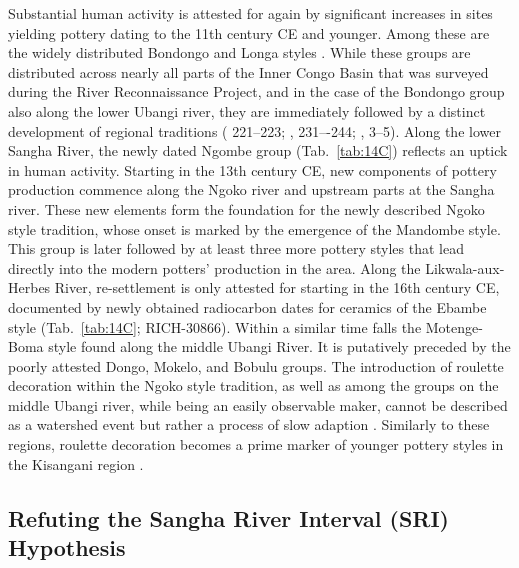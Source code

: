\documentclass[smallextended,natbib]{svjour3}       %
\begin{document}
Substantial human activity is attested for again by significant increases in sites yielding pottery dating to the 11th century CE and younger. Among these are the widely distributed Bondongo and Longa styles \citep[Fig.~\ref{fig:bayes}; \ref{fig:chrono}; Tab.~\ref{tab:bayes};][121--139]{Wotzka.1995}. While these groups are distributed across nearly all parts of the Inner Congo Basin that was surveyed during the River Reconnaissance Project, and in the case of the Bondongo group also along the lower Ubangi river, they are immediately followed by a distinct development of regional traditions (\citeauthor{Wotzka.1995} \citeyear{Wotzka.1995} 221--223; \citeauthor{Seidensticker.2021e} \citeyear{Seidensticker.2021e}, 231–-244; \citeauthor{Seidensticker.2021} \citeyear{Seidensticker.2021}, 3--5). Along the lower Sangha River, the newly dated Ngombe group (Tab.~\ref{tab:14C}) reflects an uptick in human activity. Starting in the 13th century CE, new components of pottery production commence along the Ngoko river and upstream parts at the Sangha river. These new elements form the foundation for the newly described Ngoko style tradition, whose onset is marked by the emergence of the Mandombe style. This group is later followed by at least three more pottery styles that lead directly into the modern potters’ production in the area. Along the Likwala-aux-Herbes River, re-settlement is only attested for starting in the 16th century CE, documented by newly obtained radiocarbon dates for ceramics of the Ebambe style (Tab.~\ref{tab:14C}; RICH-30866). Within a similar time falls the Motenge-Boma style found along the middle Ubangi River. It is putatively preceded by the poorly attested Dongo, Mokelo, and Bobulu groups. The introduction of roulette decoration within the Ngoko style tradition, as well as among the groups on the middle Ubangi river, while being an easily observable maker, cannot be described as a watershed event but rather a process of slow adaption \citep[120--123]{Seidensticker.2016b}. Similarly to these regions, roulette decoration becomes a prime marker of younger pottery styles in the Kisangani region \citep{LivingstoneSmith.2017}. 

\subsection*{Refuting the Sangha River Interval (SRI) Hypothesis}
\end{document}
